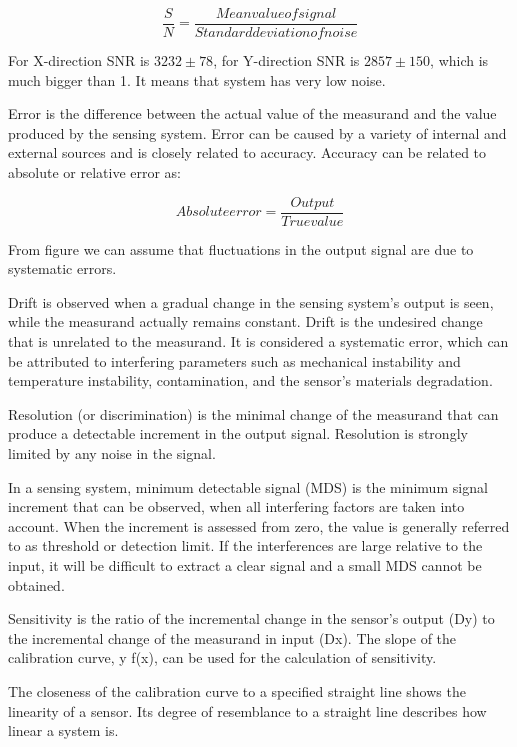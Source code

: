 \begin{equation}
\frac{S}{N}=\frac{Mean value of signal}{Standard deviation of noise}
\end{equation}

For X-direction SNR is $3232 \pm 78$, for Y-direction SNR is $2857 \pm 150$, which is much bigger than 1. It means that system has very low noise.

Error is the difference between the actual value of the measurand and the value produced by the sensing system. Error can be caused by a variety of internal and external sources and is closely related to accuracy. Accuracy can be related to absolute or relative error as:

\begin{equation}
Absolute error = \frac{Output}{ True value}
\end{equation}

From figure we can assume that fluctuations in the output signal are due to systematic errors. 

Drift is observed when a gradual change in the sensing system’s output is seen, while the measurand actually remains constant. Drift is the undesired change that is unrelated to the measurand. It is considered a systematic error, which can be attributed to interfering parameters such as mechanical instability and temperature instability, contamination, and the sensor’s materials degradation. 

Resolution (or discrimination) is the minimal change of the measurand that can produce a detectable increment in the output signal. Resolution is strongly limited by any noise in the signal.

In a sensing system, minimum detectable signal (MDS) is the minimum signal increment that can be observed, when all interfering factors are taken into account. When the increment is assessed from zero, the value is generally referred to as threshold or detection limit. If the interferences are large relative to the input, it will be difficult to extract a clear signal and a small MDS cannot be obtained.

Sensitivity is the ratio of the incremental change in the sensor’s output (Dy) to the incremental change of the measurand in input (Dx). The slope of the calibration curve, y f(x), can be used for the calculation of sensitivity.

The closeness of the calibration curve to a specified straight line shows the linearity of a sensor. Its degree of resemblance to a straight line describes how linear a system is.

